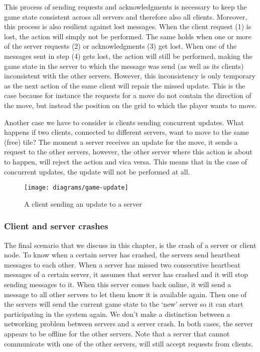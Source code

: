 This process of sending requests and acknowledgments is necessary to keep the game state consistent across all servers and therefore also all clients. 
Moreover, this process is also resilient against lost messages. 
When the client request (1) is lost, the action will simply not be performed. 
The same holds when one or more of the server requests (2) or acknowledgments (3) get lost. 
When one of the messages sent in step (4) gets lost, the action will still be performed, making the game state in the server to which the message was send (as well as its clients) inconsistent with the other servers. 
However, this inconsistency is only temporary as the next action of the same client will repair the missed update. 
This is the case because for instance the requests for a move do not contain the direction of the move, but instead the position on the grid to which the player wants to move.

Another case we have to consider is clients sending concurrent updates. 
What happens if two clients, connected to different servers, want to move to the same (free) tile? 
The moment a server receives an update for the move, it sends a request to the other servers, however, the other server where this action is about to happen, will reject the action and vica versa. 
This means that in the case of concurrent updates, the update will not be performed at all.

\begin{figure}[h!]
  \centering
    \texttt{[image: diagrams/game-update]}
    
  \caption{A client sending an update to a server}
  \label{fig:update_diagram}
\end{figure}

\subsubsection{Client and server crashes}
\label{subsubsec:client_server_crashes}
The final scenario that we discuss in this chapter, is the crash of a server or client node. 
To know when a certain server has crashed, the servers send heartbeat messages to each other. 
When a server has missed two consecutive heartbeat messages of a certain server, it assumes that server has crashed and it will stop sending messages to it.
When this server comes back online, it will send a message to all other servers to let them know it is available again. 
Then one of the servers will send the current game state to the `new' server so it can start participating in the system again.
We don't make a distinction between a networking problem between servers and a server crash. 
In both cases, the server appears to be offline for the other servers. 
Note that a server that cannot communicate with one of the other servers, will still accept requests from clients.

